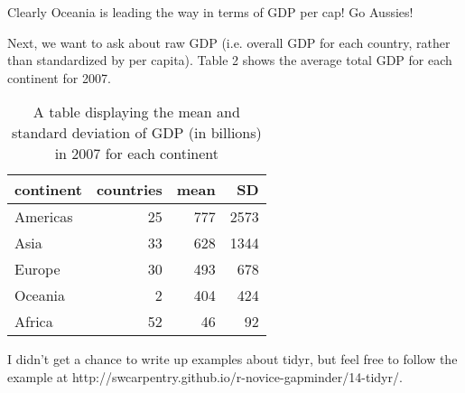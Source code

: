 \documentclass[english]{article}\usepackage[]{graphicx}\usepackage[]{color}
\begin{document}
Clearly Oceania is leading the way in terms of GDP per cap! Go Aussies!

Next, we want to ask about raw GDP (i.e. overall GDP for each country, rather than standardized by per capita). Table 2 shows the average total GDP for each continent for 2007.


\begin{table}[H]
\centering
\begin{tabular}{lrrr}
  \hline
continent & countries & mean & SD \\ 
  \hline
Americas & 25 & 777 & 2573 \\ 
  Asia & 33 & 628 & 1344 \\ 
  Europe & 30 & 493 & 678 \\ 
  Oceania & 2 & 404 & 424 \\ 
  Africa & 52 & 46 & 92 \\ 
   \hline
\end{tabular}
\caption{A table displaying the mean and standard deviation of GDP (in billions) in 2007 for each continent} 
\label{total_gdp_table}
\end{table}


I didn't get a chance to write up examples about tidyr, but feel free to follow the example at http://swcarpentry.github.io/r-novice-gapminder/14-tidyr/.
\end{document}
